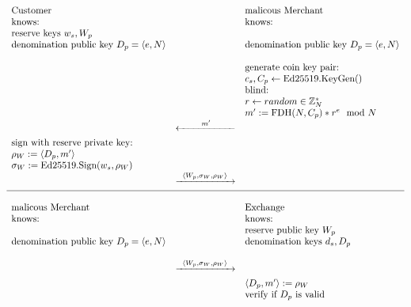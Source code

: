 \begin{figure}[h]
    \begin{equation*}
        \begin{array}{ l c l}
            \text{Customer} &  & \text{malicous Merchant}
            \\ \text{knows:} & & \text{knows:}
            \\ \text{reserve keys } w_s, W_p
            \\ \text{denomination public key } D_p = \langle e, N \rangle & & \text{denomination public key } D_p = \langle e, N \rangle
            \\
            \\ & & \text{generate coin key pair:}
            \\ & & c_s, C_p \leftarrow \text{Ed25519.KeyGen}()
            \\ & & \text{blind:}
            \\ & & r \leftarrow random \in \mathbb{Z}_N^*
            \\ & & m' := \text{FDH}(N, C_p)*r^{e} \mod N
            \\ & \xleftarrow[\rule{2cm}{0pt}]{m'}
            \\ \text{sign with reserve private key:}            
            \\ \rho_W := \langle D_p, m' \rangle
            \\ \sigma_W := \text{Ed25519.Sign}(w_s, \rho_W)
            \\ & \xrightarrow[\rule{2cm}{0pt}]{ \langle W_p, \sigma_W, \rho_W \rangle }
            \\
            \hline
            \\
            \text{malicous Merchant} &  & \text{Exchange}
            \\\text{knows:} & & \text{knows:}
            \\& & \text{reserve public key } W_p
            \\ \text{denomination public key } D_p = \langle e, N \rangle & & \text{denomination keys } d_s, D_p
            \\
            \\ & \xrightarrow[\rule{2cm}{0pt}]{ \langle W_p, \sigma_W, \rho_W \rangle }
            \\ & & \langle D_p, m' \rangle := \rho_W
            \\ & & \text{verify if } D_p \text{ is valid}

\end{array}
\end{equation*}
\end{figure}
